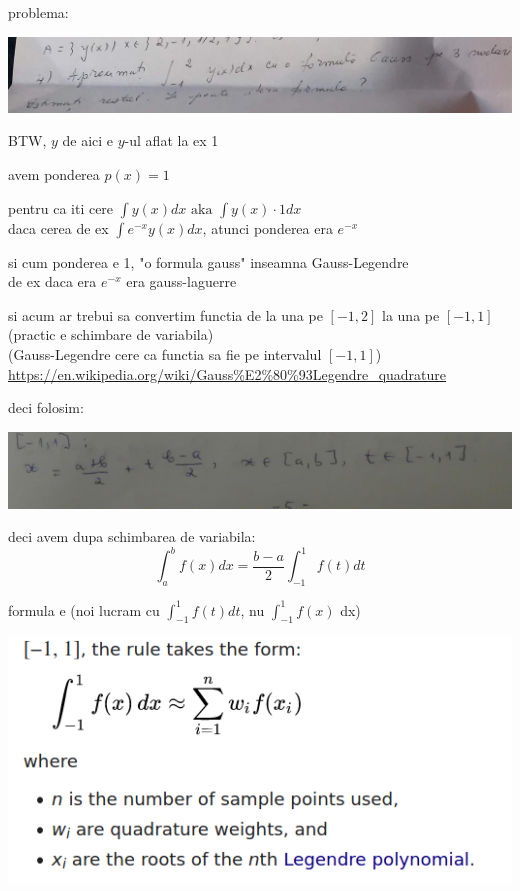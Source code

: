 \documentclass[11pt]{article}
\date{\today}
\title{}
\begin{document}
problema:
\begin{center}
\includegraphics[width=\linewidth]{./problema.png}
\end{center}

BTW, \(y\) de aici e \(y\)-ul aflat la ex 1

avem ponderea \(p(x) = 1\)
\medskip

pentru ca iti cere \(\displaystyle \int y(x) dx \text{ aka } \int y(x) \cdot 1 dx\)\\
daca cerea de ex \(\displaystyle \int e^{-x} y(x) dx\), atunci ponderea era \(e^{-x}\)
\medskip

si cum ponderea e 1, "o formula gauss" inseamna Gauss-Legendre\\
de ex daca era \(e^{-x}\) era gauss-laguerre
\medskip

si acum ar trebui sa convertim functia de la una pe \([-1, 2]\) la una pe \([-1, 1]\) (practic e schimbare de variabila)\\
(Gauss-Legendre cere ca functia sa fie pe intervalul \([-1, 1]\))\\
\url{https://en.wikipedia.org/wiki/Gauss\%E2\%80\%93Legendre\_quadrature}
\medskip

deci folosim:
\begin{center}
\includegraphics[width=\linewidth]{./a,b to -1,1.png}
\end{center}

deci avem dupa schimbarea de variabila:
\[ \int_a^b f(x) dx = \frac{b-a}{2} \int_{-1}^1 f(t) dt \]

formula e (noi lucram cu \(\int_{-1}^1 f(t) dt\), nu \(\int_{-1}^1 f(x)\) dx)
\begin{center}
\includegraphics[width=.6\linewidth]{./formula.png}
\end{center}
\end{document}
